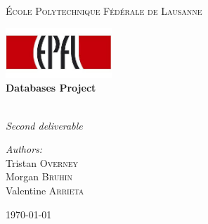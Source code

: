 \begin{titlepage}
\begin{center}


\textsc{\LARGE \'Ecole Polytechnique Fédérale de Lausanne}

\includegraphics[width=0.3\textwidth]{EPFL_logo.jpg}~\\[5cm]

{ \huge \bfseries Databases Project \\[0.4cm] }

\HRule \\[0.4cm]

{ \huge \emph{Second deliverable} \\[6cm] }

\noindent
\begin{minipage}{0.4\textwidth}
\begin{center} \large
\emph{Authors:}\\
Tristan \textsc{Overney}\\
Morgan \textsc{Bruhin}\\
Valentine \textsc{Arrieta}
\end{center}
\end{minipage}%


\vfill

{\large \today}

\end{center}
\end{titlepage}